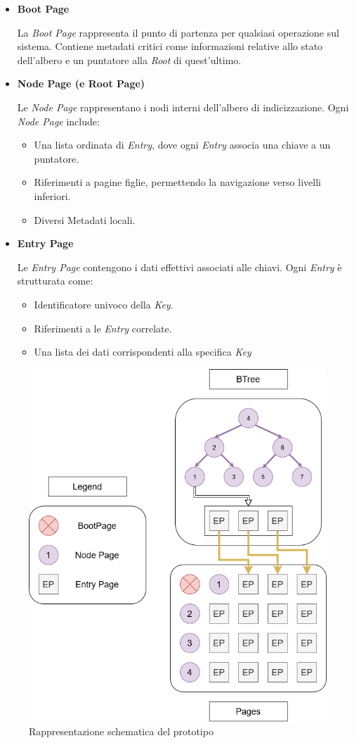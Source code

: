 \documentclass[12pt,a4paper,openright,twoside]{book}
\begin{document}
            \begin{itemize}
                \item \textbf{Boot Page}

                La \textit{Boot Page} rappresenta il punto di partenza per qualsiasi operazione sul sistema. Contiene metadati critici come informazioni relative allo stato dell'albero e un puntatore alla \textit{Root} di quest'ultimo.

                \pagebreak

                \item \textbf{Node Page (e Root Page)}

                Le \textit{Node Page} rappresentano i nodi interni dell’albero di indicizzazione.
                Ogni \textit{Node Page} include:
                \begin{itemize}
                    \item Una lista ordinata di \textit{Entry}, dove ogni \textit{Entry} associa una chiave a un puntatore.
                    \item Riferimenti a pagine figlie, permettendo la navigazione verso livelli inferiori.
                    \item Diversi Metadati locali.
                \end{itemize}

                \item \textbf{Entry Page}

                Le \textit{Entry Page} contengono i dati effettivi associati alle chiavi. Ogni \textit{Entry} è strutturata come:
                \begin{itemize}
                    \item Identificatore univoco della \textit{Key}.
                    \item Riferimenti a le \textit{Entry} correlate.
                    \item Una lista dei dati corrispondenti alla specifica \textit{Key}
                \end{itemize}
            \end{itemize}

            \begin{figure} [h]
                \centering
                \includegraphics[width=.45\linewidth]{figures/Prototipo.png}
                \caption{Rappresentazione schematica del prototipo}
                \label{fig:prototipo}
            \end{figure}
\end{document}
